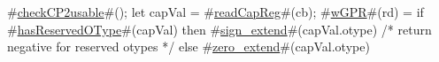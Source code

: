 #\hyperref[sailMIPSzcheckCP2usable]{checkCP2usable}#();
let capVal = #\hyperref[sailMIPSzreadCapReg]{readCapReg}#(cb);
#\hyperref[sailMIPSzwGPR]{wGPR}#(rd) = if #\hyperref[sailMIPSzhasReservedOType]{hasReservedOType}#(capVal)
  then #\hyperref[sailMIPSzsignzyextend]{sign\_extend}#(capVal.otype) /* return negative for reserved otypes */
  else #\hyperref[sailMIPSzzzerozyextend]{zero\_extend}#(capVal.otype)
